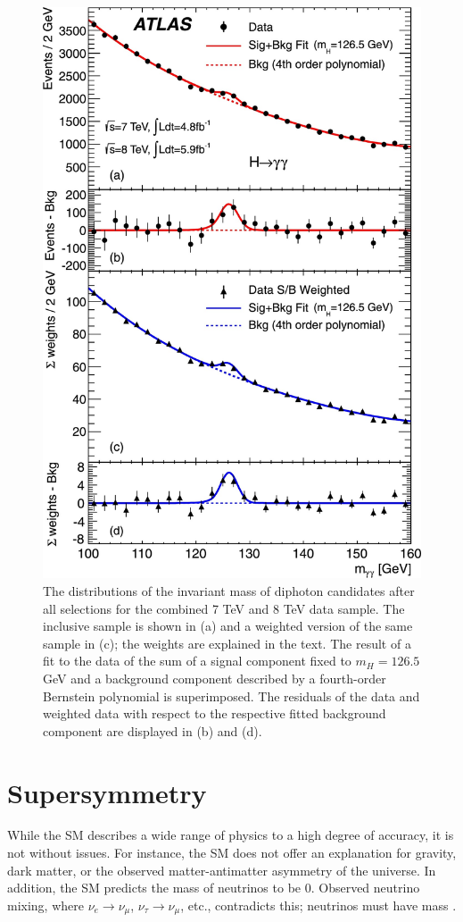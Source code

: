 		\begin{figure}[!ht]
		\centering
		\includegraphics[width=.7\textwidth,keepaspectratio=true]{chapters/chapter2_theory/images/Higgs_Discovery_gam_gam.jpeg}
		\caption{The distributions of the invariant mass of diphoton candidates after all selections for the combined 7 TeV and 8 TeV data sample. The inclusive sample is shown in (a) and a weighted version of the same sample in (c); the weights are explained in the text. The result of a fit to the data of the sum of a signal component fixed to $m_H=126.5$ GeV  and a background component described by a fourth-order Bernstein polynomial is superimposed. The residuals of the data and weighted data with respect to the respective fitted background component are displayed in (b) and (d). \cite{higgs-discovery-atlas}}
		\label{fig:higgs-discovery}
		\end{figure}

\section{Supersymmetry}\label{sec:SUSY}
	While the \gls{SM} describes a wide range of physics to a high degree of accuracy, it is not without issues. For instance, the \gls{SM} does not offer an explanation for gravity, dark matter, or the observed matter-antimatter asymmetry of the universe. In addition, the \gls{SM} predicts the mass of neutrinos to be 0. Observed neutrino mixing, where $\nu_e \to \nu_\mu$, $\nu_\tau \to \nu_\mu$, etc., contradicts this; neutrinos must have mass \cite{pdg}.

